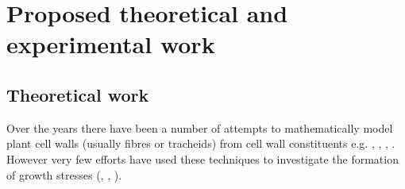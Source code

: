 \section{Proposed theoretical and experimental work}
\subsection{Theoretical work}
Over the years there have been a number of attempts to mathematically model plant
cell walls (usually fibres or tracheids) from cell wall constituents e.g. \cite{mark1967cell}, \cite{Astley_1998}, \cite{Yamamoto_2002}, \cite{Kojima_2004}. However very few efforts have used these
techniques to investigate the formation of growth stresses (\cite{Archer_1987},
\cite{Yamamoto_1998}, \cite{Guitard_1999}).